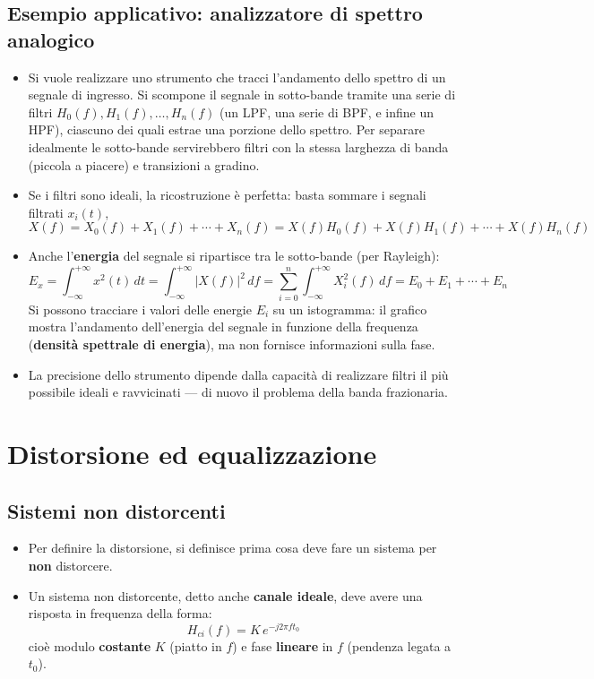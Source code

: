 \documentclass[12pt, a4paper]{article}
\begin{document}
\subsection{Esempio applicativo: analizzatore di spettro analogico}
\begin{itemize}
    \item Si vuole realizzare uno strumento che tracci l'andamento dello spettro di un segnale di ingresso. Si scompone il segnale in sotto-bande tramite una serie di filtri $H_0(f),H_1(f),\dots,H_n(f)$ (un LPF, una serie di BPF, e infine un HPF), ciascuno dei quali estrae una porzione dello spettro. Per separare idealmente le sotto-bande servirebbero filtri con la stessa larghezza di banda (piccola a piacere) e transizioni a gradino.
    \item Se i filtri sono ideali, la ricostruzione è perfetta: basta sommare i segnali filtrati $x_i(t)$,
    $$X(f) = X_0(f)+X_1(f)+\cdots+X_n(f) = X(f)H_0(f)+X(f)H_1(f)+\cdots+X(f)H_n(f)$$
    \item Anche l'\textbf{energia} del segnale si ripartisce tra le sotto-bande (per Rayleigh):
    $$E_x = \int_{-\infty}^{+\infty} x^2(t)\,dt = \int_{-\infty}^{+\infty} |X(f)|^2\,df = \sum_{i=0}^{n} \int_{-\infty}^{+\infty} X_i^2(f)\,df = E_0+E_1+\cdots+E_n$$
    Si possono tracciare i valori delle energie $E_i$ su un istogramma: il grafico mostra l'andamento dell'energia del segnale in funzione della frequenza (\textbf{densità spettrale di energia}), ma non fornisce informazioni sulla fase.
    \item La precisione dello strumento dipende dalla capacità di realizzare filtri il più possibile ideali e ravvicinati — di nuovo il problema della banda frazionaria.
\end{itemize}



\section{Distorsione ed equalizzazione}

\subsection{Sistemi non distorcenti}
\begin{itemize}
    \item Per definire la distorsione, si definisce prima cosa deve fare un sistema per \textbf{non} distorcere.
    \item Un sistema non distorcente, detto anche \textbf{canale ideale}, deve avere una risposta in frequenza della forma:
    $$H_{ci}(f) = K\,e^{-j2\pi ft_0}$$
    cioè modulo \textbf{costante} $K$ (piatto in $f$) e fase \textbf{lineare} in $f$ (pendenza legata a $t_0$).
\end{itemize}
\end{document}
